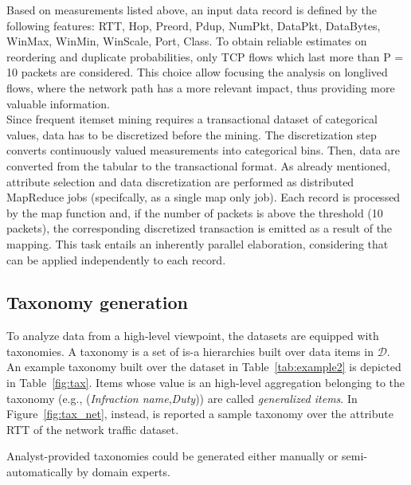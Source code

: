 Based on measurements listed above, an input data record is
defined by the following features: RTT, Hop, P{reord},
P{dup}, NumPkt, DataPkt, DataBytes, WinMax,
WinMin, WinScale, Port, Class. To obtain reliable
estimates on reordering and duplicate probabilities, only
TCP flows which last more than P = 10 packets are
considered. This choice allow focusing the analysis on longlived
flows, where the network path has a more relevant
impact, thus providing more valuable information.\\
Since frequent itemset mining requires a transactional dataset of
categorical values, data has to be discretized before the mining.
The discretization step converts continuously
valued measurements into categorical bins. Then, data
are converted from the tabular to the transactional format.
As already mentioned, attribute selection and data discretization are performed as distributed MapReduce jobs (specifcally, as a single map only job). Each
record is processed by the map function and, if the number
of packets is above the threshold (10 packets), the corresponding
discretized transaction is emitted as a result of the
mapping. This task entails an inherently parallel elaboration,
considering that can be applied independently to each record.



\subsection{Taxonomy generation}
\label{taxmapping}

To analyze data from a high-level viewpoint, the datasets are equipped with taxonomies.
A taxonomy is a set of is-a hierarchies built over data items in $\mathcal{D}$. 
An example taxonomy built over the dataset in Table~\ref{tab:example2} is depicted in Table~\ref{fig:tax}. 
Items whose value is an high-level aggregation belonging to the taxonomy (e.g., (\textit{Infraction name},\textit{Duty})) are called \textit{generalized items}. 
In Figure~\ref{fig:tax_net}, instead, is reported a sample taxonomy over the attribute RTT of the network traffic dataset.

Analyst-provided taxonomies could be generated either manually or semi-automatically by domain experts. 

